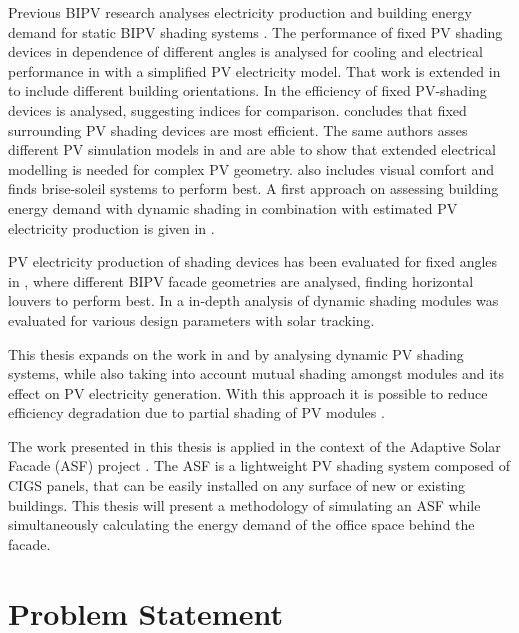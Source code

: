 	Previous BIPV research analyses electricity production and building energy demand for static BIPV shading systems \cite{sun2010, sun2012, David2011, mandalaki2012assessment, Mandalaki2014complexPV, mandalaki2014assessment, yoo2011available, jayathissa2015abs}. The performance of fixed PV shading devices in dependence of different angles is analysed for cooling and electrical performance in \cite{sun2010} with a simplified PV electricity model. That work is extended in \cite{sun2012} to include different building orientations. In \cite{David2011} the efficiency of fixed PV-shading devices is analysed, suggesting indices for comparison. \cite{mandalaki2012assessment} concludes that fixed surrounding PV shading devices are most efficient. The same authors asses different PV simulation models in \cite{Mandalaki2014complexPV} and are able to show that extended electrical modelling is needed for complex PV geometry. \cite{mandalaki2014assessment} also includes visual comfort and finds brise-soleil systems to perform best. A first approach on assessing building energy demand with dynamic shading in combination with estimated PV electricity production is given in \cite{jayathissa2015abs}. 

	PV electricity production of shading devices has been evaluated for fixed angles in \cite{freitas2015maximizing}, where different BIPV facade geometries are analysed, finding horizontal louvers to perform best. In \cite{hofer2015PVSEC} a in-depth analysis of dynamic shading modules was evaluated for various design parameters with solar tracking. 

	This thesis expands on the work in \cite{jayathissa2015abs} and \cite{hofer2015PVSEC} by analysing dynamic PV shading systems, while also taking into account mutual shading amongst modules and its effect on PV electricity generation. With this approach it is possible to reduce efficiency degradation due to partial shading of PV modules \cite{hofer2015PVSEC}.

	The work presented in this thesis is applied in the context of the Adaptive Solar Facade (ASF) project \cite{nagy2015frontiers}. The ASF is a lightweight PV shading system composed of CIGS panels, that can be easily installed on any surface of new or existing buildings. This thesis will present a methodology of simulating an ASF while simultaneously calculating the energy demand of the office space behind the facade.


\section{Problem Statement}\

